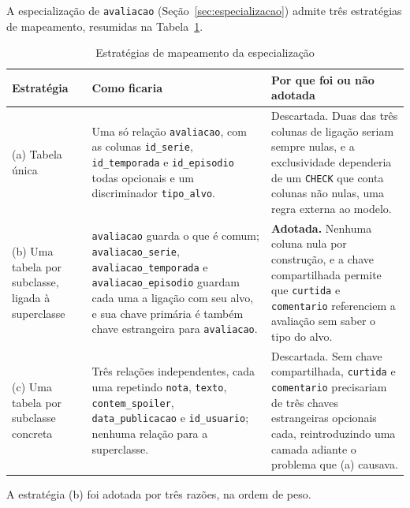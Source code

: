\documentclass[a4paper,12pt,oneside,openany]{book}
\newcommand{\id}[1]{\texttt{#1}}
\begin{document}
A especialização de \id{avaliacao} (Seção~\ref{sec:especializacao}) admite três
estratégias de mapeamento, resumidas na Tabela~\ref{tab:estrategias}.

\begin{table}[H]
\centering
\caption{Estratégias de mapeamento da especialização}
\label{tab:estrategias}
\small
\begin{tabularx}{\textwidth}{@{}p{3.4cm}XX@{}}
\toprule
\textbf{Estratégia} & \textbf{Como ficaria} & \textbf{Por que foi ou não adotada} \\
\midrule
(a) Tabela única & Uma só relação \id{avaliacao}, com as colunas \id{id\_serie},
\id{id\_temporada} e \id{id\_episodio} todas opcionais e um discriminador
\id{tipo\_alvo}. &
Descartada. Duas das três colunas de ligação seriam sempre nulas, e a exclusividade dependeria de um \id{CHECK} que conta colunas não nulas, uma regra externa ao modelo. \\
\addlinespace
(b) Uma tabela por subclasse, ligada à superclasse & \id{avaliacao} guarda o que é
comum; \id{avaliacao\_serie}, \id{avaliacao\_temporada} e \id{avaliacao\_episodio}
guardam cada uma a ligação com seu alvo, e sua chave primária é também chave
estrangeira para \id{avaliacao}. &
\textbf{Adotada.} Nenhuma coluna nula por construção, e a chave compartilhada
permite que \id{curtida} e \id{comentario} referenciem a avaliação sem saber o tipo
do alvo. \\
\addlinespace
(c) Uma tabela por subclasse concreta & Três relações independentes, cada uma
repetindo \id{nota}, \id{texto}, \id{contem\_spoiler}, \id{data\_publicacao} e
\id{id\_usuario}; nenhuma relação para a superclasse. &
Descartada. Sem chave compartilhada, \id{curtida} e \id{comentario} precisariam de
três chaves estrangeiras opcionais cada, reintroduzindo uma camada adiante o problema que (a) causava. \\
\bottomrule
\end{tabularx}
\end{table}

A estratégia (b) foi adotada por três razões, na ordem de peso.
\end{document}
